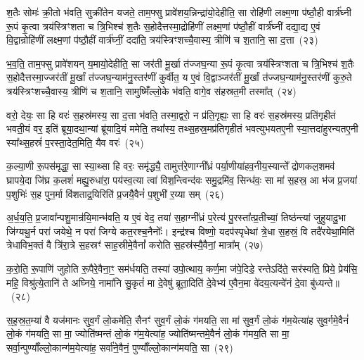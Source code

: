 श॒तैः सोमः॑ क्री॒तो भ॑वति॒ सुक्री॑तेन यजते॒ ताम॒फ्सु प्रावे॑शय॒न्निन्द्रा॑यो॒देहीति॒ सा रोहि॑णी लक्ष्म॒णा प॑ष्ठौ॒ही वार्त्र॑घ्नी रू॒पं कृ॒त्वा त्रय॑स्त्रिꣳशता च त्रि॒भिश्च॑ श॒तैः स॒होदैत्तस्मा॒द्रोहि॑णीं लक्ष्म॒णां प॑ष्ठौ॒हीं वार्त्र॑घ्नीं दद्या॒द्य ए॒वं वि॒द्वान्रोहि॑णीं लक्ष्म॒णां प॑ष्ठौ॒हीं वार्त्र॑घ्नीं॒ ददा॑ति॒ त्रय॑स्त्रिꣳशच्चै॒वास्य॒ त्रीणि॑ च श॒तानि॒ सा द॒त्ता~(२३)

भ॒व॒ति॒ ताम॒फ्सु प्रावे॑शयन् य॒मायो॒देहीति॒ सा जर॑ती मू॒र्खा त॑ज्जघ॒न्या रू॒पं कृ॒त्वा त्रय॑स्त्रिꣳशता च त्रि॒भिश्च॑ श॒तैः स॒होदैत्तस्मा॒ज्जर॑तीं मू॒र्खां त॑ज्जघ॒न्याम॑नु॒स्तर॑णीं कुर्वीत॒ य ए॒वं वि॒द्वाञ्जर॑तीं मू॒र्खां त॑ज्जघ॒न्याम॑नु॒स्तर॑णीं कुरु॒ते त्रय॑स्त्रिꣳशच्चै॒वास्य॒ त्रीणि॑ च श॒तानि॒ सामुष्मिँ॑ल्लो॒के भ॑वति॒ वागे॒व स॑हस्रत॒मी तस्मा᳚त्~(२४)

वरो॒ देयः॒ सा हि वरः॑ स॒हस्र॑मस्य॒ सा द॒त्ता भ॑वति॒ तस्मा॒द्वरो॒ न प्र॑ति॒गृह्यः॒ सा हि वरः॑ स॒हस्र॑मस्य॒ प्रति॑गृहीतं भवती॒यं वर॒ इति॑ ब्रूया॒दथा॒न्यां ब्रू॑यादि॒यं ममेति॒ तथा᳚स्य॒ तथ्स॒हस्र॒मप्र॑तिगृहीतं भवत्युभयतए॒नी स्या॒त्तदा॑हुरन्यत\-ए॒नी स्या᳚थ्स॒हस्रं॑ प॒रस्ता॒देत॒मिति॒ यैव वरः॑~(२५)

क॒ल्या॒णी रू॒पस॑मृद्धा॒ सा स्या॒थ्सा हि वरः॒ समृ॑द्ध्यै॒ तामुत्त॑रे॒णाग्नी᳚ध्रं पर्या॒णीया॑हव॒नीय॒स्यान्ते᳚ द्रोणकल॒शमव॑ घ्रापये॒दा जि॑घ्र क॒लशं॑ मह्यु॒रुधा॑रा॒ पय॑स्व॒त्या त्वा॑ विश॒न्त्विन्द॑वः समु॒द्रमि॑व॒ सिन्ध॑वः॒ सा मा॑ स॒हस्र॒ आ भ॑ज प्र॒जया॑ प॒शुभिः॑ स॒ह पुन॒र्मा वि॑शताद्र॒यिरिति॑ प्र॒जयै॒वैनं॑ प॒शुभी॑ र॒य्या सम्~(२६)

अ॒र्ध॒य॒ति॒ प्र॒जावा᳚न्पशु॒मान्र॑यि॒मान्भ॑वति॒ य ए॒वं वेद॒ तया॑ स॒हाग्नी᳚ध्रं प॒रेत्य॑ पु॒रस्ता᳚त्प्र॒तीच्यां॒ तिष्ठ॑न्त्यां जुहुयादु॒भा जि॑ग्यथु॒र्न परा॑ जयेथे॒ न परा॑ जिग्ये कत॒रश्च॒नैनोः᳚। इन्द्र॑श्च विष्णो॒ यदप॑स्पृधेथां त्रे॒धा स॒हस्रं॒ वि तदै॑रयेथा॒मिति॑ त्रेधाविभ॒क्तं वै त्रि॑रा॒त्रे स॒हस्रꣳ॑ साह॒स्रीमे॒वैनां᳚ करोति स॒हस्र॑स्यै॒वैनां॒ मात्रा᳚म्~(२७)

क॒रो॒ति॒ रू॒पाणि॑ जुहोति रू॒पैरे॒वैना॒ꣳ॒ सम॑र्धयति॒ तस्या॑ उपो॒त्थाय॒ कर्ण॒मा ज॑पे॒दिडे॒ रन्ते\-ऽदि॑ते॒ सर॑स्वति॒ प्रिये॒ प्रेय॑सि॒ महि॒ विश्रु॑त्ये॒तानि॑ ते अघ्निये॒ नामा॑नि सु॒कृतं॑ मा दे॒वेषु॑ ब्रूता॒दिति॑ दे॒वेभ्य॑ ए॒वैन॒मा वे॑दय॒त्यन्वे॑नं दे॒वा बु॑ध्यन्ते॥~(२८)

{\anuvakamend[{ए॒तदे॒तस्यां᳚ वी॒र्य॑मस्य त्रि॒भिश्च॑ द॒त्ता स॑हस्रत॒मी तस्मा॑दे॒व वरः॒ सं मात्रा॒मेका॒न्नच॑त्वारि॒ꣳ॒शच्च॑}]}%

स॒ह॒स्र॒त॒म्या॑ वै यज॑मानः सुव॒र्गं लो॒कमे॑ति॒ सैनꣳ॑ सुव॒र्गं लो॒कं ग॑मयति॒ सा मा॑ सुव॒र्गं लो॒कं ग॑म॒येत्या॑ह सुव॒र्गमे॒वैनं॑ लो॒कं ग॑मयति॒ सा मा॒ ज्योति॑ष्मन्तं लो॒कं ग॑म॒येत्या॑ह॒ ज्योति॑ष्मन्तमे॒वैनं॑ लो॒कं ग॑मय॒ति सा मा॒ सर्वा॒न्पुण्याँ᳚ल्लो॒कान्ग॑म॒येत्या॑ह॒ सर्वा॑ने॒वैनं॒ पुण्याँ᳚ल्लो॒कान्ग॑मयति॒ सा~(२९)

